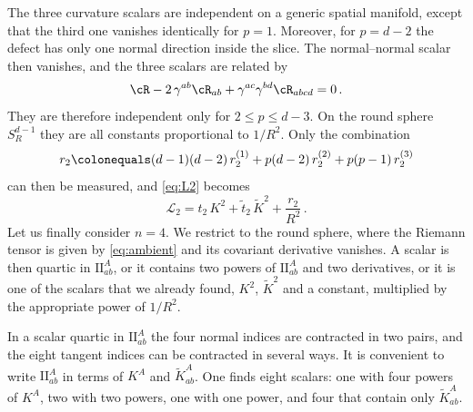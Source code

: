 \documentclass[a4paper,11pt]{article}
\newcommand{\II}{\mathrm{I\!I}}
\newcommand{\Kt}{\widetilde{K}}
\begin{document}
The three curvature scalars are independent on a generic spatial manifold, except that the third one vanishes identically for $p=1$. Moreover, for $p=d-2$ the defect has only one normal direction inside the slice. The normal--normal scalar then vanishes, and the three scalars are related by
\begin{equation}
	\cR-2\,\gamma^{ab}\cR_{ab}+\gamma^{ac}\gamma^{bd}\cR_{abcd}=0\, .
\end{equation}
They are therefore independent only for $2\le p\le d-3$. On the round sphere $S^{d-1}_R$ they are all constants proportional to $1/R^2$. Only the combination
\begin{equation}\label{eq:r2}
	r_2\colonequals(d-1)(d-2)\,r_2^{(1)}+p(d-2)\,r_2^{(2)}+p(p-1)\,r_2^{(3)}
\end{equation}
can then be measured, and \eqref{eq:L2} becomes
\begin{equation}\label{eq:L2sphere}
	\mathcal{L}_2=t_2\,K^2+\tilde t_2\,\Kt^2+\frac{r_2}{R^2}\, .
\end{equation}
Let us finally consider $n=4$. We restrict to the round sphere, where the Riemann tensor is given by \eqref{eq:ambient} and its covariant derivative vanishes. A scalar is then quartic in $\II^A_{ab}$, or it contains two powers of $\II^A_{ab}$ and two derivatives, or it is one of the scalars that we already found, $K^2$, $\Kt^2$ and a constant, multiplied by the appropriate power of $1/R^2$.

In a scalar quartic in $\II^A_{ab}$ the four normal indices are contracted in two pairs, and the eight tangent indices can be contracted in several ways. It is convenient to write $\II^A_{ab}$ in terms of $K^A$ and $\Kt^A_{ab}$. One finds eight scalars: one with four powers of $K^A$, two with two powers, one with one power, and four that contain only $\Kt^A_{ab}$.
\end{document}
